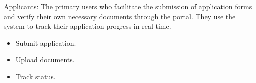 \vspace{0.2cm}
\noindent Applicants:
The primary users who facilitate the submission of application forms and verify their own necessary documents through the portal. They use the system to track their application progress in real-time.
\begin{itemize}
    \item Submit application.
    \item Upload documents.
    \item Track status.
\end{itemize}